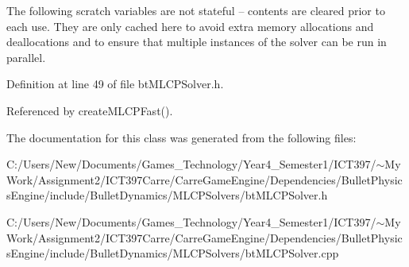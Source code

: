 The following scratch variables are not stateful -- contents are cleared prior to each use. They are only cached here to avoid extra memory allocations and deallocations and to ensure that multiple instances of the solver can be run in parallel. 

Definition at line 49 of file btMLCPSolver.h.

Referenced by createMLCPFast().

The documentation for this class was generated from the following files:\begin{CompactItemize}
\item 
C:/Users/New/Documents/Games\_\-Technology/Year4\_\-Semester1/ICT397/$\sim$My Work/Assignment2/ICT397Carre/CarreGameEngine/Dependencies/BulletPhysicsEngine/include/BulletDynamics/MLCPSolvers/btMLCPSolver.h\item 
C:/Users/New/Documents/Games\_\-Technology/Year4\_\-Semester1/ICT397/$\sim$My Work/Assignment2/ICT397Carre/CarreGameEngine/Dependencies/BulletPhysicsEngine/include/BulletDynamics/MLCPSolvers/btMLCPSolver.cpp\end{CompactItemize}
